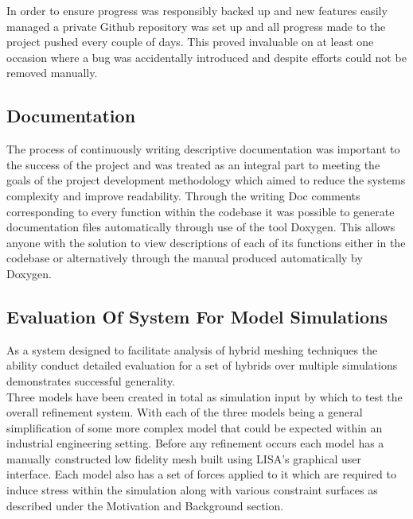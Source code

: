 \noindent
In order to ensure progress was responsibly backed up and new features easily managed a private Github repository was set up and all progress made to the project pushed every couple of days. This proved invaluable on at least one occasion where a bug was accidentally introduced and despite efforts could not be removed manually. 


\subsection{Documentation}
The process of continuously writing descriptive documentation was important to the success of the project and was treated as an integral part to meeting the goals of the project development methodology which aimed to reduce the systems complexity and improve readability. Through the writing Doc comments corresponding to every function within the codebase it was possible to generate documentation files automatically through use of the tool Doxygen. This allows anyone with the solution to view descriptions of each of its functions either in the codebase or alternatively through the manual produced automatically by Doxygen. \\ 

 

\subsection{Evaluation Of System For Model Simulations}

As a system designed to facilitate analysis of hybrid meshing techniques the ability conduct detailed evaluation for a set of hybrids over multiple simulations demonstrates successful generality. \\

\noindent
Three models have been created in total as simulation input by which to test the overall refinement system. With each of the three models being a general simplification of some more complex model that could be expected within an industrial engineering setting. Before any refinement occurs each model has a manually constructed low fidelity mesh built using LISA's graphical user interface. Each model also has a set of forces applied to it which are required to induce stress within the simulation along with various constraint surfaces as described under the Motivation and Background section. \\ 

